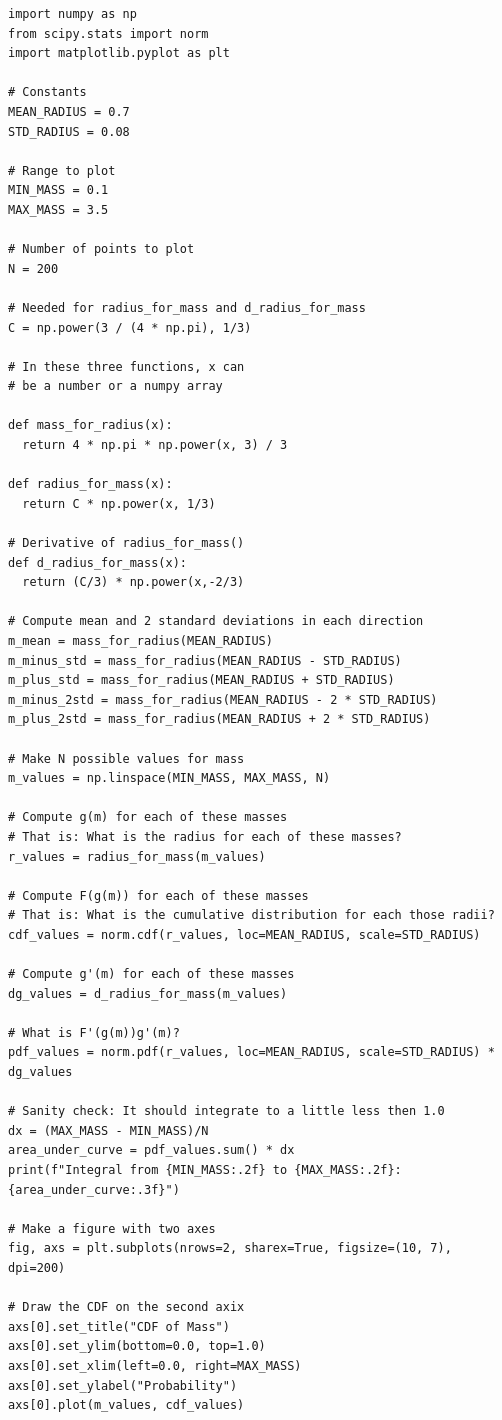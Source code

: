\begin{verbatim}
import numpy as np
from scipy.stats import norm
import matplotlib.pyplot as plt

# Constants
MEAN_RADIUS = 0.7
STD_RADIUS = 0.08

# Range to plot
MIN_MASS = 0.1
MAX_MASS = 3.5

# Number of points to plot
N = 200

# Needed for radius_for_mass and d_radius_for_mass
C = np.power(3 / (4 * np.pi), 1/3)

# In these three functions, x can
# be a number or a numpy array

def mass_for_radius(x):
  return 4 * np.pi * np.power(x, 3) / 3

def radius_for_mass(x):
  return C * np.power(x, 1/3)

# Derivative of radius_for_mass()
def d_radius_for_mass(x):
  return (C/3) * np.power(x,-2/3)

# Compute mean and 2 standard deviations in each direction
m_mean = mass_for_radius(MEAN_RADIUS)
m_minus_std = mass_for_radius(MEAN_RADIUS - STD_RADIUS)
m_plus_std = mass_for_radius(MEAN_RADIUS + STD_RADIUS)
m_minus_2std = mass_for_radius(MEAN_RADIUS - 2 * STD_RADIUS)
m_plus_2std = mass_for_radius(MEAN_RADIUS + 2 * STD_RADIUS)

# Make N possible values for mass
m_values = np.linspace(MIN_MASS, MAX_MASS, N)

# Compute g(m) for each of these masses
# That is: What is the radius for each of these masses?
r_values = radius_for_mass(m_values)

# Compute F(g(m)) for each of these masses
# That is: What is the cumulative distribution for each those radii?
cdf_values = norm.cdf(r_values, loc=MEAN_RADIUS, scale=STD_RADIUS)

# Compute g'(m) for each of these masses
dg_values = d_radius_for_mass(m_values)

# What is F'(g(m))g'(m)?
pdf_values = norm.pdf(r_values, loc=MEAN_RADIUS, scale=STD_RADIUS) * dg_values

# Sanity check: It should integrate to a little less then 1.0
dx = (MAX_MASS - MIN_MASS)/N
area_under_curve = pdf_values.sum() * dx
print(f"Integral from {MIN_MASS:.2f} to {MAX_MASS:.2f}: {area_under_curve:.3f}")

# Make a figure with two axes
fig, axs = plt.subplots(nrows=2, sharex=True, figsize=(10, 7), dpi=200)

# Draw the CDF on the second axix
axs[0].set_title("CDF of Mass")
axs[0].set_ylim(bottom=0.0, top=1.0)
axs[0].set_xlim(left=0.0, right=MAX_MASS)
axs[0].set_ylabel("Probability")
axs[0].plot(m_values, cdf_values)


\end{verbatim}
